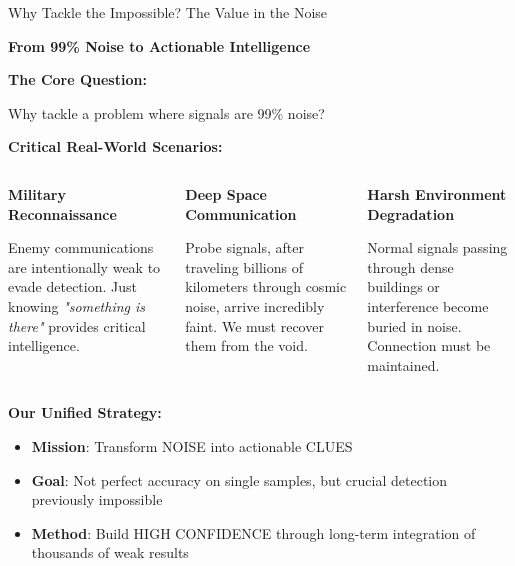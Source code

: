 \documentclass[aspectratio=169]{beamer}
\begin{document}
\begin{frame}{Why Tackle the Impossible? The Value in the Noise}
\begin{center}
\textcolor{zjutblue}{\Large \textbf{From 99\% Noise to Actionable Intelligence}}
\end{center}

\vspace{0.4cm}

\textbf{\textcolor{zjutred}{The Core Question:}}
\begin{center}
\textcolor{zjutred}{\large Why tackle a problem where signals are 99\% noise?}
\end{center}

\vspace{0.3cm}

\textbf{\textcolor{zjutblue}{Critical Real-World Scenarios:}}

\begin{columns}
\begin{column}{0.32\textwidth}
\begin{center}
\textbf{\textcolor{zjutgreen}{Military Reconnaissance}}
\end{center}
\small
Enemy communications are intentionally weak to evade detection. Just knowing \textit{"something is there"} provides critical intelligence.
\end{column}

\begin{column}{0.32\textwidth}
\begin{center}
\textbf{\textcolor{zjutgreen}{Deep Space Communication}}
\end{center}
\small
Probe signals, after traveling billions of kilometers through cosmic noise, arrive incredibly faint. We must recover them from the void.
\end{column}

\begin{column}{0.32\textwidth}
\begin{center}
\textbf{\textcolor{zjutgreen}{Harsh Environment Degradation}}
\end{center}
\small
Normal signals passing through dense buildings or interference become buried in noise. Connection must be maintained.
\end{column}
\end{columns}

\vspace{0.4cm}

\textbf{\textcolor{zjutblue}{Our Unified Strategy:}}
\begin{itemize}
\item \textbf{Mission}: Transform NOISE into actionable CLUES
\item \textbf{Goal}: Not perfect accuracy on single samples, but crucial detection previously impossible
\item \textbf{Method}: Build HIGH CONFIDENCE through long-term integration of thousands of weak results
\end{itemize}


\end{frame}
\end{document}
